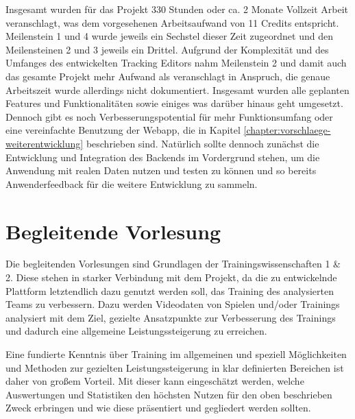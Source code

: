 Insgesamt wurden für das Projekt 330 Stunden oder ca. 2 Monate Vollzeit Arbeit veranschlagt, was dem vorgesehenen Arbeitsaufwand von 11 Credits entspricht. Meilenstein 1 und 4 wurde jeweils ein Sechstel dieser Zeit zugeordnet und den Meilensteinen 2 und 3 jeweils ein Drittel. Aufgrund der Komplexität und des Umfanges des entwickelten Tracking Editors nahm Meilenstein 2 und damit auch das gesamte Projekt mehr Aufwand als veranschlagt in Anspruch, die genaue Arbeitszeit wurde allerdings nicht dokumentiert. Insgesamt wurden alle geplanten Features und Funktionalitäten sowie einiges was darüber hinaus geht umgesetzt. Dennoch gibt es noch Verbesserungspotential für mehr Funktionsumfang oder eine vereinfachte Benutzung der Webapp, die in Kapitel \ref{chapter:vorschlaege-weiterentwicklung} beschrieben sind. Natürlich sollte dennoch zunächst die Entwicklung und Integration des Backends im Vordergrund stehen, um die Anwendung mit realen Daten nutzen und testen zu können und so bereits Anwenderfeedback für die weitere Entwicklung zu sammeln.


\section{Begleitende Vorlesung}

Die begleitenden Vorlesungen sind Grundlagen der Trainingswissenschaften 1 \& 2.
Diese stehen in starker Verbindung mit dem Projekt, da die zu entwickelnde Plattform letztendlich dazu genutzt werden soll, das Training des analysierten Teams zu verbessern. Dazu werden Videodaten von Spielen und/oder Trainings analysiert mit dem Ziel, gezielte Ansatzpunkte zur Verbesserung des Trainings und dadurch eine allgemeine Leistungssteigerung zu erreichen.

Eine fundierte Kenntnis über Training im allgemeinen und speziell Möglichkeiten und Methoden zur gezielten Leistungssteigerung in klar definierten Bereichen ist daher von großem Vorteil. Mit dieser kann eingeschätzt werden, welche Auswertungen und Statistiken den höchsten Nutzen für den oben beschrieben Zweck erbringen und wie diese präsentiert und gegliedert werden sollten.
